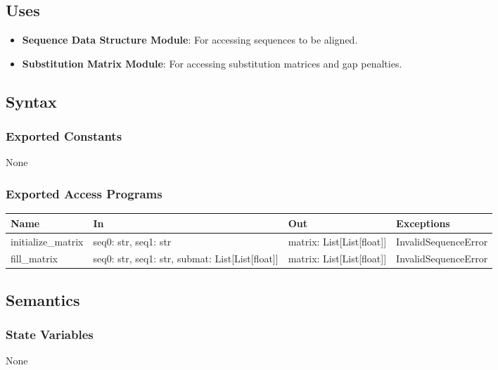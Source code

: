 \documentclass[12pt, titlepage]{article}
\begin{document}
\subsection{Uses}

\begin{itemize}
    \item \textbf{Sequence Data Structure Module}: For accessing sequences to be aligned.
    \item \textbf{Substitution Matrix Module}: For accessing substitution matrices and gap penalties.
\end{itemize}

\subsection{Syntax}

\subsubsection{Exported Constants}

None

\subsubsection{Exported Access Programs}

\begin{center}
\begin{tabular}{p{4cm} p{4cm} p{3cm} p{2cm}}
\hline
\textbf{Name} & \textbf{In} & \textbf{Out} & \textbf{Exceptions} \\
\hline
initialize\_matrix & seq0: str, seq1: str & matrix: List[List[float]] & InvalidSequenceError \\
fill\_matrix & seq0: str, seq1: str, submat: List[List[float]] & matrix: List[List[float]] & InvalidSequenceError \\
\hline
\end{tabular}
\end{center}

\subsection{Semantics}

\subsubsection{State Variables}

None
\end{document}

